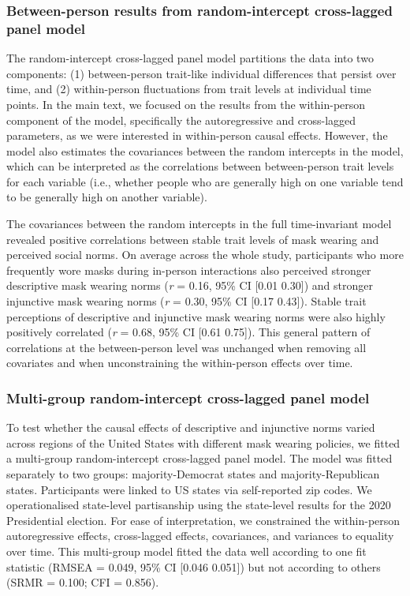 \documentclass[
  man, donotrepeattitle,floatsintext]{apa6}
\begin{document}
\hypertarget{between-person-results-from-random-intercept-cross-lagged-panel-model}{%
\subsubsection{Between-person results from random-intercept cross-lagged panel model}\label{between-person-results-from-random-intercept-cross-lagged-panel-model}}

The random-intercept cross-lagged panel model partitions the data into two components: (1) between-person trait-like individual differences that persist over time, and (2) within-person fluctuations from trait levels at individual time points. In the main text, we focused on the results from the within-person component of the model, specifically the autoregressive and cross-lagged parameters, as we were interested in within-person causal effects. However, the model also estimates the covariances between the random intercepts in the model, which can be interpreted as the correlations between between-person trait levels for each variable (i.e., whether people who are generally high on one variable tend to be generally high on another variable).

The covariances between the random intercepts in the full time-invariant model revealed positive correlations between stable trait levels of mask wearing and perceived social norms. On average across the whole study, participants who more frequently wore masks during in-person interactions also perceived stronger descriptive mask wearing norms (\emph{r} = 0.16, 95\% CI {[}0.01 0.30{]}) and stronger injunctive mask wearing norms (\emph{r} = 0.30, 95\% CI {[}0.17 0.43{]}). Stable trait perceptions of descriptive and injunctive mask wearing norms were also highly positively correlated (\emph{r} = 0.68, 95\% CI {[}0.61 0.75{]}). This general pattern of correlations at the between-person level was unchanged when removing all covariates and when unconstraining the within-person effects over time.

\hypertarget{multi-group-random-intercept-cross-lagged-panel-model}{%
\subsubsection{Multi-group random-intercept cross-lagged panel model}\label{multi-group-random-intercept-cross-lagged-panel-model}}

To test whether the causal effects of descriptive and injunctive norms varied across regions of the United States with different mask wearing policies, we fitted a multi-group random-intercept cross-lagged panel model. The model was fitted separately to two groups: majority-Democrat states and majority-Republican states. Participants were linked to US states via self-reported zip codes. We operationalised state-level partisanship using the state-level results for the 2020 Presidential election. For ease of interpretation, we constrained the within-person autoregressive effects, cross-lagged effects, covariances, and variances to equality over time. This multi-group model fitted the data well according to one fit statistic (RMSEA = 0.049, 95\% CI {[}0.046 0.051{]}) but not according to others (SRMR = 0.100; CFI = 0.856).
\end{document}
